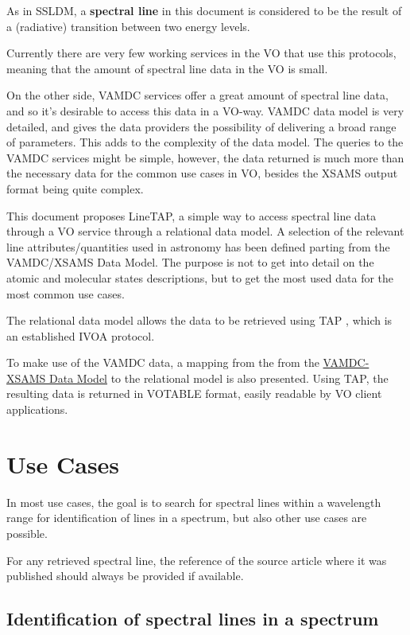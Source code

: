 \documentclass[11pt,a4paper]{ivoa}
\begin{document}
As  in SSLDM, a \textbf{spectral line} in this document is considered to
be the result of a (radiative) transition between two energy levels.

Currently there are very few working services in the VO that use this
protocols, meaning that the amount of spectral line data in the VO is
small. 

On the other side, VAMDC services offer a great amount of spectral line
data, and  so it's desirable to access this data in a VO-way. VAMDC data
model is very detailed, and gives the data providers the possibility of
delivering a broad range of parameters. This adds to the complexity of
the data model.  The queries to the VAMDC services might be simple,
however, the data returned is much more than the necessary data for the
common use cases in VO, besides the XSAMS \citep{XSAMS:Docs} output
format being quite complex.


This document proposes LineTAP, a simple way to access spectral line
data through a VO service through a relational data model.  A selection
of the relevant line attributes/quantities used in astronomy has been
defined parting from the VAMDC/XSAMS Data Model. The purpose is not to
get into detail on the atomic and molecular states descriptions, but to
get the most used data for the most common use cases. 

The relational data model allows the data to be retrieved using TAP
\citep{std:TAP}, which is an established IVOA protocol. 

To make use of the VAMDC data, a mapping from the from the
\href{https://standards.vamdc.eu/#data-model}{VAMDC-XSAMS Data Model} to
the relational model is also presented. Using TAP, the resulting data is
returned in VOTABLE format,  easily readable by VO client applications. 




\section{Use Cases}

In most use cases, the goal is to search for spectral lines within a
wavelength range for identification of lines in a spectrum, but also
other use cases are possible.

For any retrieved spectral line, the reference of the source article
where it was published should always be provided if available.



\subsection{Identification of spectral lines in a spectrum}
\end{document}

